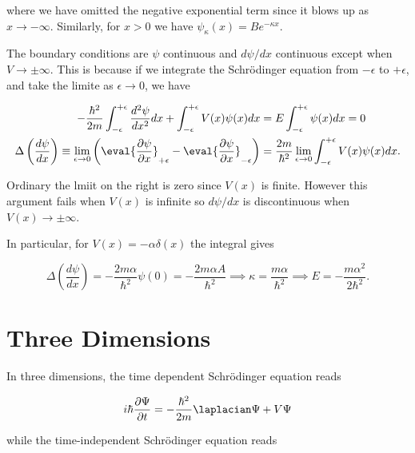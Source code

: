 \documentclass[a4paper,12pt]{report}
\begin{document}
where we have omitted the negative exponential term since it blows up as \(x \to -\infty\). Similarly, for \(x > 0\) we have \(\psi _{\kappa }(x) = Be^{-\kappa x}  \).   

The boundary conditions are \(\psi \) continuous and \(d \psi /dx\) continuous except when \(V \to \pm \infty\). This is because if we integrate the Schrödinger equation from \(- \epsilon \) to \(+ \epsilon \), and take the limite as \(\epsilon \to 0\), we have

\begin{equation}
  \begin{aligned} 
  -\frac{\hbar ^2}{2m} \int_{-\epsilon }^{+\epsilon } \frac{d^2\psi }{dx^2} dx + \int_{-\epsilon }^{+\epsilon } V(x)\psi (x) dx &= E \int_{-\epsilon }^{+\epsilon } \psi (x)dx = 0 \\
  \Delta \left( \frac{d\psi }{dx}  \right) \equiv  \lim_{\epsilon  \to 0} \left( \eval{\frac{\partial \psi }{\partial x} }_{+\epsilon }^{} - \eval{\frac{\partial \psi }{\partial x} }_{-\epsilon }^{}   \right) &= \frac{2m}{\hbar ^2} \lim_{\epsilon  \to 0}  \int_{-\epsilon }^{+\epsilon } V(x)\psi (x)dx.  
  \end{aligned} 
\end{equation}

Ordinary the lmiit on the right is zero since \(V(x)\) is finite. However this argument fails when \(V(x)\) is infinite so \(d\psi /dx\) is discontinuous when \(V(x) \to \pm \infty\).    

In particular, for \(V(x) = - \alpha \delta (x)\) the integral gives 

\begin{equation}
  \Delta \left( \frac{d\psi }{dx}  \right) = -\frac{2m\alpha  }{\hbar ^2} \psi (0)  = -\frac{2m\alpha A}{\hbar ^2} \implies \kappa = \frac{m\alpha }{\hbar ^2} \implies E = -\frac{m\alpha ^2}{2\hbar ^2}.   
\end{equation}

\chapter{Three Dimensions}

In three dimensions, the time dependent Schrödinger equation reads

\begin{equation}
  i \hbar \frac{\partial \Psi }{\partial t} = -\frac{\hbar ^2}{2m} \laplacian \Psi +V\Psi   
\end{equation}

while the time-independent Schrödinger equation reads
\end{document}
